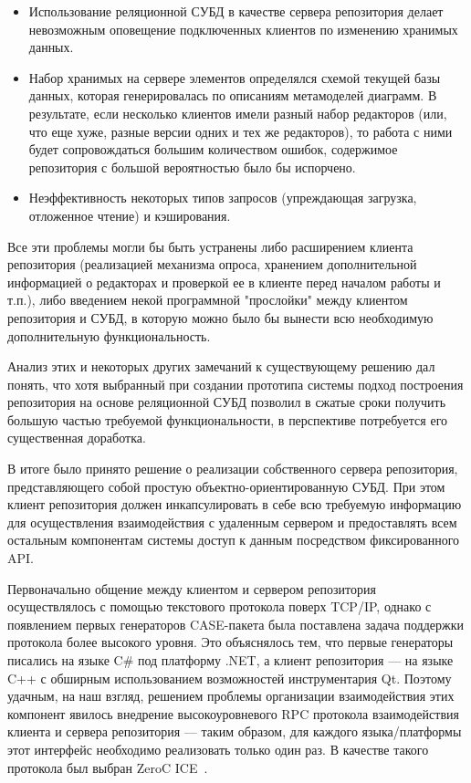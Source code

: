 \documentclass[a5paper]{article}
\begin{document}
\begin{itemize}
  \item Использование реляционной СУБД в качестве сервера репозитория делает
        невозможным оповещение подключенных клиентов по изменению хранимых
        данных.
  \item Набор хранимых на сервере элементов определялся схемой текущей базы
        данных, которая генерировалась по описаниям метамоделей диаграмм. В
        результате, если несколько клиентов имели разный набор редакторов (или,
        что еще хуже, разные версии одних и тех же редакторов), то работа с
        ними будет сопровождаться большим количеством ошибок, содержимое
        репозитория с большой вероятностью было бы испорчено.
  \item Неэффективность некоторых типов запросов (упреждающая загрузка,
        отложенное чтение) и кэширования.
\end{itemize}

Все эти проблемы могли бы быть устранены либо расширением клиента
репозитория (реализацией механизма опроса, хранением дополнительной
информацией о редакторах и проверкой ее в клиенте перед началом работы
и т.п.), либо введением некой программной "прослойки" между клиентом
репозитория и СУБД, в которую можно было бы вынести всю необходимую
дополнительную функциональность.

Анализ этих и некоторых других замечаний к существующему решению дал
понять, что хотя выбранный при создании прототипа системы подход
построения репозитория на основе реляционной СУБД позволил в сжатые
сроки получить большую частью требуемой функциональности, в перспективе
потребуется его существенная доработка. 

В итоге было принято решение о реализации собственного сервера
репозитория, представляющего собой простую объектно-ориентированную
СУБД. При этом клиент репозитория должен инкапсулировать в себе всю
требуемую информацию для осуществления взаимодействия с удаленным
сервером и предоставлять всем остальным компонентам системы доступ к
данным посредством фиксированного API. 

Первоначально общение между клиентом и сервером репозитория
осуществлялось с помощью текстового протокола поверх
TCP/IP, однако с появлением первых генераторов CASE-пакета
была поставлена задача поддержки протокола более высокого уровня. Это
объяснялось тем, что первые генераторы писались на языке
C\# под платформу .NET, а клиент репозитория --- на языке
C++ с обширным использованием возможностей
инструментария Qt. Поэтому удачным, на наш
взгляд, решением проблемы организации взаимодействия этих компонент
явилось внедрение высокоуровневого RPC
протокола взаимодействия клиента и сервера репозитория --- таким образом,
для каждого языка/платформы этот интерфейс необходимо реализовать
только один раз. В качестве такого протокола был выбран
ZeroC ICE~\cite{ice}.
\end{document}
